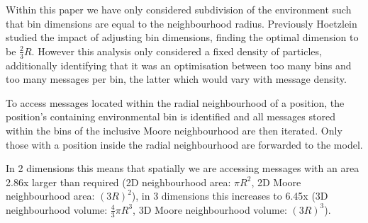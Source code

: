 Within this paper we have only considered subdivision of the environment such that bin dimensions are equal to the neighbourhood radius. Previously Hoetzlein studied the impact of adjusting bin dimensions, finding the optimal dimension to be $\frac{2}{3}R$\cite{Hoe14}. However this analysis only considered a fixed density of particles, additionally identifying that it was an optimisation between too many bins and too many messages per bin, the latter which would vary with message density.

To access messages located within the radial neighbourhood of a position, the position's containing environmental bin is identified and all messages stored within the bins of the inclusive Moore neighbourhood are then iterated. Only those with a position inside the radial neighbourhood are forwarded to the model.

In 2 dimensions this means that spatially we are accessing messages with an area 2.86x larger than required (2D neighbourhood area: $\pi R^{2}$, 2D Moore neighbourhood area: $(3R)^{2}$), in 3 dimensions this increases to 6.45x (3D neighbourhood volume: $\frac{4}{3}\pi R^{3}$, 3D Moore neighbourhood volume: $(3R)^{3}$).



      
